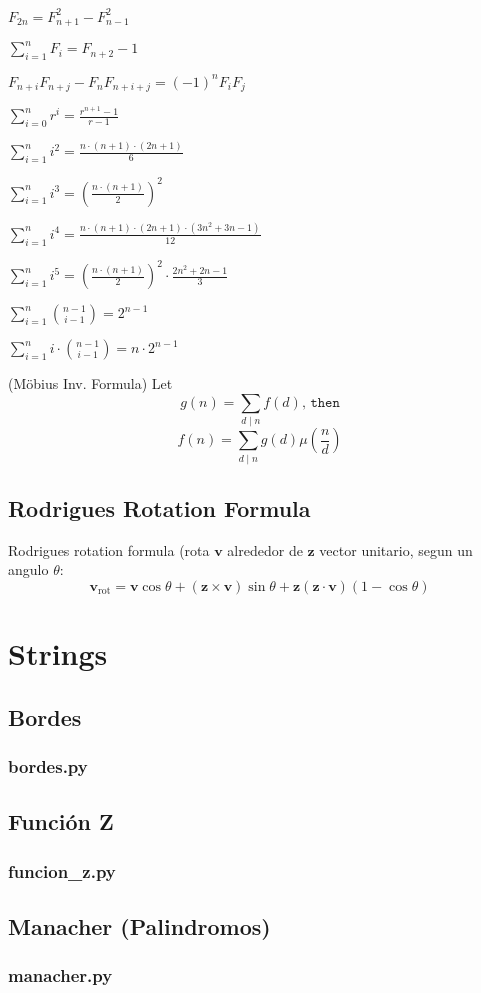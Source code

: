 \documentclass{article}
\newcommand\codefile[2]{    
    \subsubsection{#2}
    
    
}
\begin{document}
\begin{multicols*}{2}
    $F_{2n} = F_{n+1}^2 - F_{n-1}^2$

    $\sum_{i=1}^n F_i = F_{n+2}-1$

    $F_{n+i}F_{n+j} - F_nF_{n+i+j} = (-1)^n F_iF_j$

    $\sum_{i=0}^n{r^i} = \frac{r^{n+1}-1}{r-1}$
    
    $\sum_{i=1}^n{i^2} = \frac{n\cdot(n+1)\cdot(2n+1)}{6}$

    $\sum_{i=1}^n{i^3} = \left(\frac{n\cdot(n+1)}{2}\right)^2$

    $\sum_{i=1}^n{i^4} = \frac{n\cdot(n+1)\cdot(2n+1)\cdot(3n^2+3n-1)}{12}$

    $\sum_{i=1}^{ n} i^5 = \left(\frac{ n \cdot (n+1)}{2}\right) ^2 \cdot \frac{2 n ^2 + 2n - 1}{3}$

    $\sum_{i=1}^n{\binom{n-1}{i-1}} = 2^{n-1}$

    $\sum_{i=1}^n{i\cdot\binom{n-1}{i-1}} = n\cdot2^{n-1}$

    (Möbius Inv. Formula)
    Let
    \[g(n) = \sum_{d\mid n} f(d) \texttt{, then}\]
    \[f(n)=\sum_{d\mid n} g(d) \mu\left(\frac{n}{d}\right)\]


\subsection{Rodrigues Rotation Formula}
Rodrigues rotation formula (rota $\mathbf{v}$ alrededor de $\mathbf{z}$ vector unitario, segun un angulo $\theta$:
$$\mathbf{v}_\mathrm{rot} = \mathbf{v} \cos\theta + (\mathbf{z} \times \mathbf{v})\sin\theta   + \mathbf{z} (\mathbf{z} \cdot \mathbf{v}) (1 - \cos\theta)$$

\section{Strings}

\subsection{Bordes}
\codefile{strings/bordes.py}{bordes.py}

\subsection{Función Z}
\codefile{strings/funcion_z.py}{funcion\_z.py}

\subsection{Manacher (Palindromos)}
\codefile{strings/manacher.py}{manacher.py}


\end{multicols*}
\end{document}

